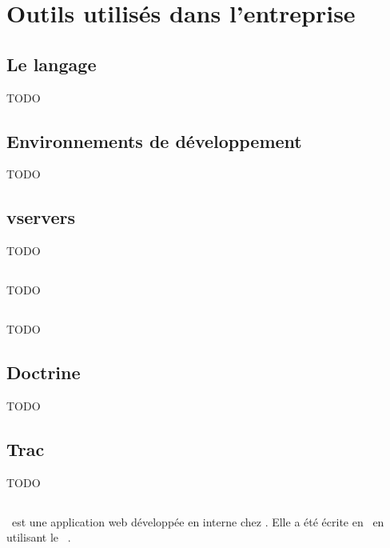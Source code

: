 \section{Outils utilisés dans l'entreprise}

\subsection{Le langage \aphp}

TODO

\subsection{Environnements de développement}

TODO

\subsection{vservers}

TODO

\subsection{\asvn}


TODO

\subsection{\asf}


TODO

\subsection{Doctrine}

TODO

\subsection{Trac}

TODO

\subsection{\asismo}

\asismo\ est une application web développée en interne chez \asl. Elle a été écrite en \aphp\ en utilisant le \afm\ \asf.


